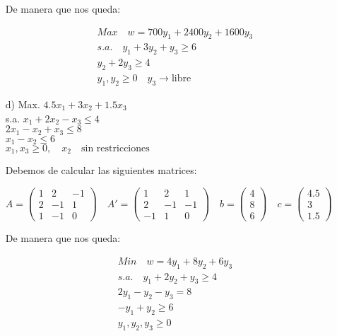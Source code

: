\begin{itemize}
    De manera que nos queda:

    \begin{align*}
        Max \quad w = 700y_1 + 2400y_2 + 1600y_3 \\
        s.a. \quad y_1 + 3y_2 + y_3 \geq 6 \\
        y_2 + 2y_3 \geq 4 \\
        y_1, y_2 \geq 0 \quad y_3 \rightarrow \text{libre}
    \end{align*}
    
    \item[d)] Max. \quad $4.5x_1 + 3x_2 + 1.5x_3$ \\
    s.a. \quad $x_1 + 2x_2 - x_3 \leq 4$ \\
    \quad \quad $2x_1 - x_2 + x_3 \leq 8$ \\
    \quad \quad $x_1 - x_2 \leq 6$ \\
    \quad \quad $x_1, x_3 \geq 0, \quad x_2 \quad \text{sin restricciones}$

    Debemos de calcular las siguientes matrices:

    $ A =
    \begin{pmatrix}
        1 & 2 & -1 \\
        2 & -1 & 1 \\
        1 & -1 & 0
    \end{pmatrix} \quad
    A' = \begin{pmatrix}
        1 & 2 & 1 \\
        2 & -1 & -1 \\
        -1 & 1 & 0
    \end{pmatrix}
    \quad b = \begin{pmatrix}
        4 \\
        8 \\
        6
    \end{pmatrix} \quad c = \begin{pmatrix}
        4.5 \\
        3 \\
        1.5
    \end{pmatrix}
    $

    De manera que nos queda:    

    \begin{align*}
        Min \quad w = 4y_1 + 8y_2 + 6y_3 \\
        s.a. \quad y_1 + 2y_2 + y_3 \geq 4 \\
        2y_1 - y_2 - y_3 = 8 \\
        - y_1 + y_2 \geq 6 \\
        y_1, y_2, y_3 \geq 0 
    \end{align*}
    

\end{itemize}

